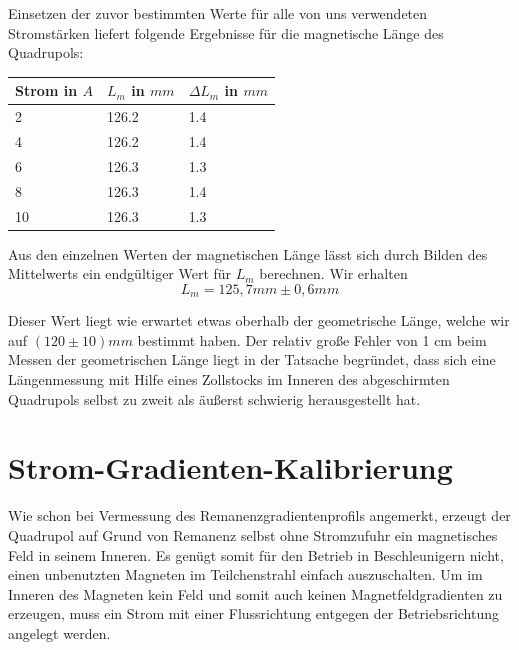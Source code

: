 \documentclass[bigchapter,colorback,accentcolor=tud4b,linedtoc,11pt]{tudreport}
\begin{document}
Einsetzen der zuvor bestimmten Werte für alle von uns verwendeten Stromstärken liefert folgende Ergebnisse für die magnetische Länge des Quadrupols:
\begin{center}
  \begin{tabular}{|p{2.6cm}|p{2.6cm}|p{2.6cm}|}
    \hline
    Strom in $A$ & $L_m$ in $mm$ & $\Delta L_m$ in $mm$ \\ \hline
    2            & 126.2         & 1.4                  \\ \hline
    4            & 126.2         & 1.4                  \\ \hline
    6            & 126.3         & 1.3                  \\ \hline
    8            & 126.3         & 1.4                  \\ \hline
    10           & 126.3         & 1.3                  \\ \hline
	\end{tabular}
\end{center}

Aus den einzelnen Werten der magnetischen Länge lässt sich durch Bilden des Mittelwerts ein endgültiger Wert für $L_m$ berechnen. Wir erhalten $$L_m=125,7mm\pm0,6mm$$

Dieser Wert liegt wie erwartet etwas oberhalb der geometrische Länge, welche wir auf $(120 \pm 10)mm$ bestimmt haben. Der relativ große Fehler von 1 cm beim Messen der geometrischen Länge liegt in der Tatsache begründet, dass sich eine Längenmessung mit Hilfe eines Zollstocks im Inneren des abgeschirmten Quadrupols selbst zu zweit als äußerst schwierig herausgestellt hat.

\section{Strom-Gradienten-Kalibrierung}
Wie schon bei Vermessung des Remanenzgradientenprofils angemerkt, erzeugt der Quadrupol auf Grund von Remanenz selbst ohne Stromzufuhr ein magnetisches Feld in seinem Inneren. Es genügt somit für den Betrieb in Beschleunigern nicht, einen unbenutzten Magneten im Teilchenstrahl einfach auszuschalten. Um im Inneren des Magneten kein Feld und somit auch keinen Magnetfeldgradienten zu erzeugen, muss ein Strom mit einer Flussrichtung entgegen der Betriebsrichtung angelegt werden.
\end{document}
